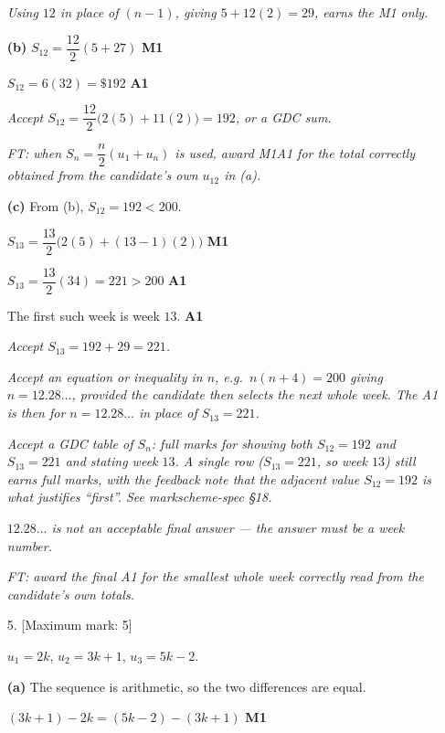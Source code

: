 \documentclass[12pt, twoside]{article}
\begin{document}
\begin{enumerate}[itemsep=0.3cm]
\emph{Using $12$ in place of $(n - 1)$, giving $5 + 12(2) = 29$, earns the
M1 only.}

\medskip

\textbf{(b)} $S_{12} = \dfrac{12}{2}(5 + 27)$ \hfill \textbf{M1}

$S_{12} = 6(32) = \$192$ \hfill \textbf{A1}

\emph{Accept $S_{12} = \dfrac{12}{2}\bigl(2(5) + 11(2)\bigr) = 192$, or a
GDC sum.}

\emph{FT: when $S_{n} = \dfrac{n}{2}(u_{1} + u_{n})$ is used, award M1A1
for the total correctly obtained from the candidate's own $u_{12}$ in (a).}

\medskip

\textbf{(c)} From (b), $S_{12} = 192 < 200$.

$S_{13} = \dfrac{13}{2}\bigl(2(5) + (13 - 1)(2)\bigr)$ \hfill \textbf{M1}

$S_{13} = \dfrac{13}{2}(34) = 221 > 200$ \hfill \textbf{A1}

The first such week is week $13$. \hfill \textbf{A1}

\emph{Accept $S_{13} = 192 + 29 = 221$.}

\emph{Accept an equation or inequality in $n$, e.g.\ $n(n + 4) = 200$ giving
$n = 12.28\ldots$, provided the candidate then selects the next whole week.
The A1 is then for $n = 12.28\ldots$ in place of $S_{13} = 221$.}

\emph{Accept a GDC table of $S_{n}$: full marks for showing both
$S_{12} = 192$ and $S_{13} = 221$ and stating week $13$. A single row
($S_{13} = 221$, so week $13$) still earns full marks, with the feedback
note that the adjacent value $S_{12} = 192$ is what justifies ``first''.
See markscheme-spec §18.}

\emph{$12.28\ldots$ is not an acceptable final answer --- the answer must
be a week number.}

\emph{FT: award the final A1 for the smallest whole week correctly read
from the candidate's own totals.}

\newpage

\item[5.] [Maximum mark: 5]

$u_{1} = 2k$, \quad $u_{2} = 3k + 1$, \quad $u_{3} = 5k - 2$.

\medskip

\textbf{(a)} The sequence is arithmetic, so the two differences are equal.

$(3k + 1) - 2k = (5k - 2) - (3k + 1)$ \hfill \textbf{M1}


\end{enumerate}
\end{document}
